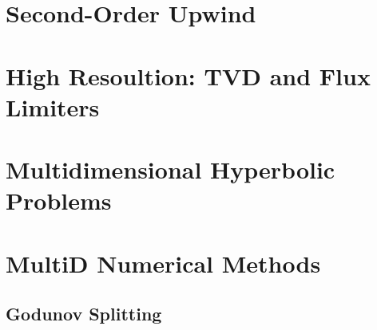 \documentclass[]{article}
\begin{document}
\section{Second-Order Upwind}

\section{High Resoultion: TVD and Flux Limiters}

\section{Multidimensional Hyperbolic Problems}

\section{MultiD Numerical Methods}
\subsection{Godunov Splitting}
\end{document}
